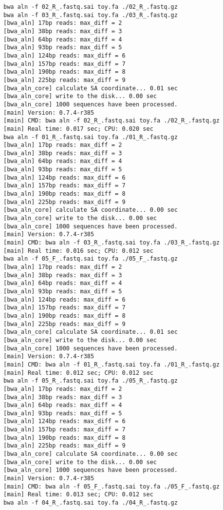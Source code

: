 \documentclass{article}
\begin{document}
\begin{lstlisting}
bwa aln -f 02_R_.fastq.sai toy.fa ./02_R_.fastq.gz
bwa aln -f 03_R_.fastq.sai toy.fa ./03_R_.fastq.gz
[bwa_aln] 17bp reads: max_diff = 2
[bwa_aln] 38bp reads: max_diff = 3
[bwa_aln] 64bp reads: max_diff = 4
[bwa_aln] 93bp reads: max_diff = 5
[bwa_aln] 124bp reads: max_diff = 6
[bwa_aln] 157bp reads: max_diff = 7
[bwa_aln] 190bp reads: max_diff = 8
[bwa_aln] 225bp reads: max_diff = 9
[bwa_aln_core] calculate SA coordinate... 0.01 sec
[bwa_aln_core] write to the disk... 0.00 sec
[bwa_aln_core] 1000 sequences have been processed.
[main] Version: 0.7.4-r385
[main] CMD: bwa aln -f 02_R_.fastq.sai toy.fa ./02_R_.fastq.gz
[main] Real time: 0.017 sec; CPU: 0.020 sec
bwa aln -f 01_R_.fastq.sai toy.fa ./01_R_.fastq.gz
[bwa_aln] 17bp reads: max_diff = 2
[bwa_aln] 38bp reads: max_diff = 3
[bwa_aln] 64bp reads: max_diff = 4
[bwa_aln] 93bp reads: max_diff = 5
[bwa_aln] 124bp reads: max_diff = 6
[bwa_aln] 157bp reads: max_diff = 7
[bwa_aln] 190bp reads: max_diff = 8
[bwa_aln] 225bp reads: max_diff = 9
[bwa_aln_core] calculate SA coordinate... 0.00 sec
[bwa_aln_core] write to the disk... 0.00 sec
[bwa_aln_core] 1000 sequences have been processed.
[main] Version: 0.7.4-r385
[main] CMD: bwa aln -f 03_R_.fastq.sai toy.fa ./03_R_.fastq.gz
[main] Real time: 0.016 sec; CPU: 0.012 sec
bwa aln -f 05_F_.fastq.sai toy.fa ./05_F_.fastq.gz
[bwa_aln] 17bp reads: max_diff = 2
[bwa_aln] 38bp reads: max_diff = 3
[bwa_aln] 64bp reads: max_diff = 4
[bwa_aln] 93bp reads: max_diff = 5
[bwa_aln] 124bp reads: max_diff = 6
[bwa_aln] 157bp reads: max_diff = 7
[bwa_aln] 190bp reads: max_diff = 8
[bwa_aln] 225bp reads: max_diff = 9
[bwa_aln_core] calculate SA coordinate... 0.01 sec
[bwa_aln_core] write to the disk... 0.00 sec
[bwa_aln_core] 1000 sequences have been processed.
[main] Version: 0.7.4-r385
[main] CMD: bwa aln -f 01_R_.fastq.sai toy.fa ./01_R_.fastq.gz
[main] Real time: 0.012 sec; CPU: 0.012 sec
bwa aln -f 05_R_.fastq.sai toy.fa ./05_R_.fastq.gz
[bwa_aln] 17bp reads: max_diff = 2
[bwa_aln] 38bp reads: max_diff = 3
[bwa_aln] 64bp reads: max_diff = 4
[bwa_aln] 93bp reads: max_diff = 5
[bwa_aln] 124bp reads: max_diff = 6
[bwa_aln] 157bp reads: max_diff = 7
[bwa_aln] 190bp reads: max_diff = 8
[bwa_aln] 225bp reads: max_diff = 9
[bwa_aln_core] calculate SA coordinate... 0.00 sec
[bwa_aln_core] write to the disk... 0.00 sec
[bwa_aln_core] 1000 sequences have been processed.
[main] Version: 0.7.4-r385
[main] CMD: bwa aln -f 05_F_.fastq.sai toy.fa ./05_F_.fastq.gz
[main] Real time: 0.013 sec; CPU: 0.012 sec
bwa aln -f 04_R_.fastq.sai toy.fa ./04_R_.fastq.gz

\end{lstlisting}
\end{document}
